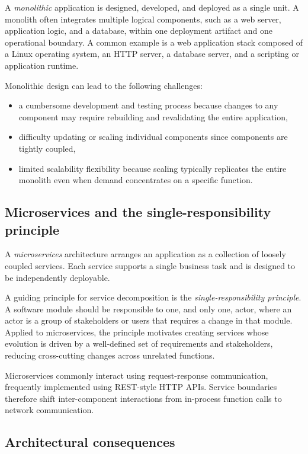 \documentclass[11pt,a4paper,openany]{report}
\begin{document}
A \emph{monolithic} application is designed, developed, and deployed as a single unit. A monolith often integrates multiple logical components, such as a web server, application logic, and a database, within one deployment artifact and one operational boundary. A common example is a web application stack composed of a Linux operating system, an HTTP server, a database server, and a scripting or application runtime.

Monolithic design can lead to the following challenges:

\begin{itemize}
\item a cumbersome development and testing process because changes to any component may require rebuilding and revalidating the entire application,
\item difficulty updating or scaling individual components since components are tightly coupled,
\item limited scalability flexibility because scaling typically replicates the entire monolith even when demand concentrates on a specific function.
\end{itemize}

\subsection{Microservices and the single-responsibility principle}

A \emph{microservices} architecture arranges an application as a collection of loosely coupled services. Each service supports a single business task and is designed to be independently deployable.

A guiding principle for service decomposition is the \emph{single-responsibility principle}. A software module should be responsible to one, and only one, actor, where an actor is a group of stakeholders or users that requires a change in that module. Applied to microservices, the principle motivates creating services whose evolution is driven by a well-defined set of requirements and stakeholders, reducing cross-cutting changes across unrelated functions.

Microservices commonly interact using request-response communication, frequently implemented using REST-style HTTP APIs. Service boundaries therefore shift inter-component interactions from in-process function calls to network communication.

\subsection{Architectural consequences}
\end{document}

